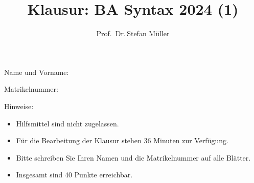 \documentclass[fleqn,10pt,a4paper]{article}
\title{Klausur: BA Syntax 2024 (1)}
\author{Prof.\ Dr.\,Stefan Müller}
\begin{document}
\maketitle


\noindent
Name und Vorname:

\noindent
Matrikelnummer: 

\medskip
\noindent
Hinweise:
\begin{itemize}
\item Hilfsmittel sind nicht zugelassen.
\item Für die Bearbeitung der Klausur stehen 36 Minuten zur Verfügung.
\item Bitte schreiben Sie Ihren Namen und die Matrikelnummer auf alle Blätter.
\item Insgesamt sind 40 Punkte erreichbar. 

\end{itemize}



\end{document}
